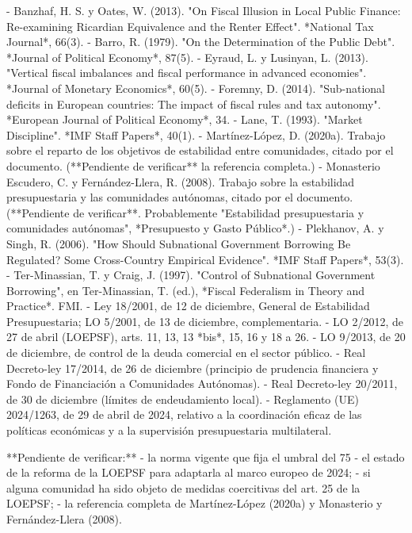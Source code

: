 \documentclass[10pt,a4paper]{article}
\begin{document}
{- Banzhaf, H. S. y Oates, W. (2013). "On Fiscal Illusion in Local Public Finance: Re-examining Ricardian Equivalence and the Renter Effect". *National Tax Journal*, 66(3).
- Barro, R. (1979). "On the Determination of the Public Debt". *Journal of Political Economy*, 87(5).
- Eyraud, L. y Lusinyan, L. (2013). "Vertical fiscal imbalances and fiscal performance in advanced economies". *Journal of Monetary Economics*, 60(5).
- Foremny, D. (2014). "Sub-national deficits in European countries: The impact of fiscal rules and tax autonomy". *European Journal of Political Economy*, 34.
- Lane, T. (1993). "Market Discipline". *IMF Staff Papers*, 40(1).
- Martínez-López, D. (2020a). Trabajo sobre el reparto de los objetivos de estabilidad entre comunidades, citado por el documento. (**Pendiente de verificar** la referencia completa.)
- Monasterio Escudero, C. y Fernández-Llera, R. (2008). Trabajo sobre la estabilidad presupuestaria y las comunidades autónomas, citado por el documento. (**Pendiente de verificar**. Probablemente "Estabilidad presupuestaria y comunidades autónomas", *Presupuesto y Gasto Público*.)
- Plekhanov, A. y Singh, R. (2006). "How Should Subnational Government Borrowing Be Regulated? Some Cross-Country Empirical Evidence". *IMF Staff Papers*, 53(3).
- Ter-Minassian, T. y Craig, J. (1997). "Control of Subnational Government Borrowing", en Ter-Minassian, T. (ed.), *Fiscal Federalism in Theory and Practice*. FMI.
- Ley 18/2001, de 12 de diciembre, General de Estabilidad Presupuestaria; LO 5/2001, de 13 de diciembre, complementaria.
- LO 2/2012, de 27 de abril (LOEPSF), arts. 11, 13, 13 *bis*, 15, 16 y 18 a 26.
- LO 9/2013, de 20 de diciembre, de control de la deuda comercial en el sector público.
- Real Decreto-ley 17/2014, de 26 de diciembre (principio de prudencia financiera y Fondo de Financiación a Comunidades Autónomas).
- Real Decreto-ley 20/2011, de 30 de diciembre (límites de endeudamiento local).
- Reglamento (UE) 2024/1263, de 29 de abril de 2024, relativo a la coordinación eficaz de las políticas económicas y a la supervisión presupuestaria multilateral.

**Pendiente de verificar:**
- la norma vigente que fija el umbral del 75%
- el estado de la reforma de la LOEPSF para adaptarla al marco europeo de 2024;
- si alguna comunidad ha sido objeto de medidas coercitivas del art. 25 de la LOEPSF;
- la referencia completa de Martínez-López (2020a) y Monasterio y Fernández-Llera (2008).

}
\end{document}
